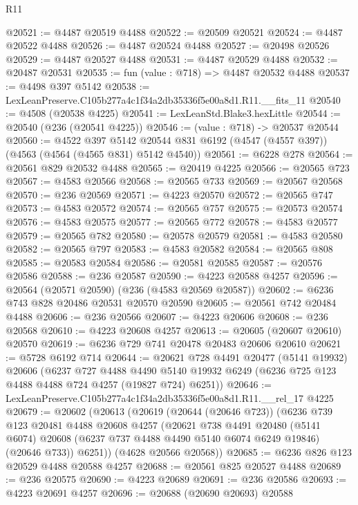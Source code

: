 \begin{lexlean}{R11}
\begin{coremodule}
@20521 := @4487 @20519 @4488
@20522 := @20509 @20521
@20524 := @4487 @20522 @4488
@20526 := @4487 @20524 @4488
@20527 := @20498 @20526
@20529 := @4487 @20527 @4488
@20531 := @4487 @20529 @4488
@20532 := @20487 @20531
@20535 := fun (value : @718) => @4487 @20532 @4488
@20537 := @4498 @397 @5142
@20538 := LexLeanPreserve.C105b277a4c1f34a2db35336f5e00a8d1.R11.__fits_11
@20540 := @4508 (@20538 @4225)
@20541 := LexLeanStd.Blake3.hexLittle
@20544 := @20540 (@236 (@20541 @4225))
@20546 := (value : @718) -> @20537 @20544
@20560 := @4522
    @397
    @5142
    @20544
    @831
    @6192
    (@4547 (@4557 @397))
    (@4563 (@4564 (@4565 @831) @5142 @4540))
@20561 := @6228 @278
@20564 := @20561 @829 @20532 @4488
@20565 := @20419 @4225
@20566 := @20565 @723
@20567 := @4583 @20566
@20568 := @20565 @733
@20569 := @20567 @20568
@20570 := @236 @20569
@20571 := @4223 @20570
@20572 := @20565 @747
@20573 := @4583 @20572
@20574 := @20565 @757
@20575 := @20573 @20574
@20576 := @4583 @20575
@20577 := @20565 @772
@20578 := @4583 @20577
@20579 := @20565 @782
@20580 := @20578 @20579
@20581 := @4583 @20580
@20582 := @20565 @797
@20583 := @4583 @20582
@20584 := @20565 @808
@20585 := @20583 @20584
@20586 := @20581 @20585
@20587 := @20576 @20586
@20588 := @236 @20587
@20590 := @4223 @20588 @4257
@20596 := @20564 (@20571 @20590) (@236 (@4583 @20569 @20587))
@20602 := @6236 @743 @828 @20486 @20531 @20570 @20590
@20605 := @20561 @742 @20484 @4488
@20606 := @236 @20566
@20607 := @4223 @20606
@20608 := @236 @20568
@20610 := @4223 @20608 @4257
@20613 := @20605 (@20607 @20610) @20570
@20619 := @6236 @729 @741 @20478 @20483 @20606 @20610
@20621 := @5728 @6192 @714
@20644 := @20621
    @728
    @4491
    @20477
    (@5141 @19932)
    @20606
    (@6237
      @727
      @4488
      @4490
      @5140
      @19932
      @6249
      (@6236 @725 @123 @4488 @4488 @724 @4257 (@19827 @724) @6251))
@20646 := LexLeanPreserve.C105b277a4c1f34a2db35336f5e00a8d1.R11.__rel_17 @4225
@20679 := @20602
    (@20613
      (@20619
        (@20644 (@20646 @723))
        (@6236
          @739
          @123
          @20481
          @4488
          @20608
          @4257
          (@20621
            @738
            @4491
            @20480
            (@5141 @6074)
            @20608
            (@6237 @737 @4488 @4490 @5140 @6074 @6249 @19846)
            (@20646 @733))
          @6251))
      (@4628 @20566 @20568))
@20685 := @6236 @826 @123 @20529 @4488 @20588 @4257
@20688 := @20561 @825 @20527 @4488
@20689 := @236 @20575
@20690 := @4223 @20689
@20691 := @236 @20586
@20693 := @4223 @20691 @4257
@20696 := @20688 (@20690 @20693) @20588

\end{coremodule}
\end{lexlean}
